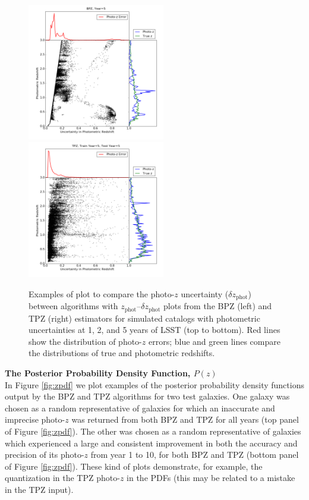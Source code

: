 \documentclass[DM,lsstdraft,toc]{lsstdoc}
\begin{document}
\begin{figure}
\begin{center}
\includegraphics[width=6cm,trim={1cm 1cm 1cm 0cm}, clip]{figures/zp_zpe_bpz_euclid_5_2.png}
\includegraphics[width=6cm,trim={1cm 1cm 1cm 0cm}, clip]{figures/zp_zpe_tpz_euclid_5_5_2.png}
\caption{Examples of plot to compare the photo-$z$ uncertainty ($\delta z_\mathrm{phot}$) between algorithms with $z_\mathrm{phot}$--$\delta z_\mathrm{phot}$ plots from the BPZ (left) and TPZ (right) estimators for simulated catalogs with photometric uncertainties at 1, 2, and 5 years of LSST (top to bottom). Red lines show the distribution of photo-$z$ errors; blue and green lines compare the distributions of true and photometric redshifts. \label{fig:pzpze}}
\end{center}
\end{figure}


\smallskip \noindent \textbf{The Posterior Probability Density Function, $P(z)$} \\
In Figure \ref{fig:zpdf} we plot examples of the posterior probability density functions output by the BPZ and TPZ algorithms for two test galaxies. One galaxy was chosen as a random representative of galaxies for which an inaccurate and imprecise photo-$z$ was returned from both BPZ and TPZ for all years (top panel of Figure \ref{fig:zpdf}). The other was chosen as a random representative of galaxies which experienced a large and consistent improvement in both the accuracy and precision of its photo-$z$ from year 1 to 10, for both BPZ and TPZ (bottom panel of Figure \ref{fig:zpdf}). These kind of plots demonstrate, for example, the quantization in the TPZ photo-$z$ in the PDFs (this may be related to a mistake in the TPZ input).
\end{document}
